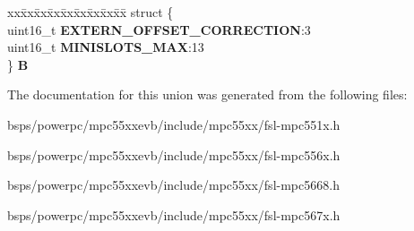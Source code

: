 \begin{DoxyCompactItemize}
\begin{tabbing}
\end{tabbing}\item 
\mbox{\label{unionuPCR29_a6ee6dfec126271d791a76e21cbc02dc2}} 
\begin{tabbing}
xx\=xx\=xx\=xx\=xx\=xx\=xx\=xx\=xx\=\kill
struct \{\\
\>uint16\_t {\bfseries EXTERN\_OFFSET\_CORRECTION}:3\\
\>uint16\_t {\bfseries MINISLOTS\_MAX}:13\\
\} {\bfseries B}\\

\end{tabbing}\end{DoxyCompactItemize}


The documentation for this union was generated from the following files\+:\begin{DoxyCompactItemize}
\item 
bsps/powerpc/mpc55xxevb/include/mpc55xx/fsl-\/mpc551x.\+h\item 
bsps/powerpc/mpc55xxevb/include/mpc55xx/fsl-\/mpc556x.\+h\item 
bsps/powerpc/mpc55xxevb/include/mpc55xx/fsl-\/mpc5668.\+h\item 
bsps/powerpc/mpc55xxevb/include/mpc55xx/fsl-\/mpc567x.\+h\end{DoxyCompactItemize}
